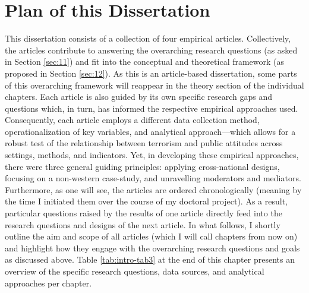 \newpage
\section{Plan of this Dissertation}
\label{sec:13}
This dissertation consists of a collection of four empirical articles. Collectively, the articles contribute to answering the overarching research questions (as asked in Section \ref{sec:11}) and fit into the conceptual and theoretical framework (as proposed in Section \ref{sec:12}). As this is an article-based dissertation, some parts of this overarching framework will reappear in the theory section of the individual chapters. Each article is also guided by its own specific research gaps and questions which, in turn, has informed the respective empirical approaches used. Consequently, each article employs a different data collection method, operationalization of key variables, and analytical approach---which allows for a robust test of the relationship between terrorism and public attitudes across settings, methods, and indicators. Yet, in developing these empirical approaches, there were three general guiding principles: applying cross-national designs, focusing on a non-western case-study, and unravelling moderators and mediators. Furthermore, as one will see, the articles are ordered chronologically (meaning by the time I initiated them over the course of my doctoral project). As a result, particular questions raised by the results of one article directly feed into the research questions and designs of the next article. In what follows, I shortly outline the aim and scope of all articles (which I will call chapters from now on) and highlight how they engage with the overarching research questions and goals as discussed above. Table \ref{tab:intro-tab3} at the end of this chapter presents an overview of the specific research questions, data sources, and analytical approaches per chapter.


